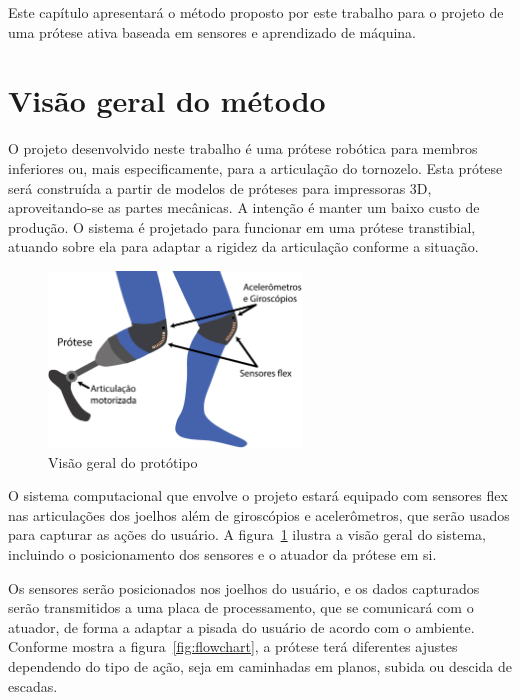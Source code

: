 Este capítulo apresentará o método proposto por este trabalho para o projeto de uma prótese ativa baseada em sensores e aprendizado de máquina.

\section{Visão geral do método}
\label{sec:metodo_protese}

O projeto desenvolvido neste trabalho é uma prótese robótica para membros inferiores ou, mais especificamente, para a articulação do tornozelo. Esta prótese será construída a partir de modelos de próteses para impressoras 3D, aproveitando-se as partes mecânicas. A intenção é manter um baixo custo de produção. O sistema é projetado para funcionar em uma prótese transtibial, atuando sobre ela para adaptar a rigidez da articulação conforme a situação.

\begin{figure}[h]
	\caption{\label{fig:big_picture}Visão geral do protótipo}
	\begin{center}
	    \includegraphics[width=0.6\textwidth]{resources/big_picture}
	\end{center}
\end{figure}

O sistema computacional que envolve o projeto estará equipado com sensores flex nas articulações dos joelhos além de giroscópios e acelerômetros, que serão usados para capturar as ações do usuário. A figura~\ref{fig:big_picture} ilustra a visão geral do sistema, incluindo o posicionamento dos sensores e o atuador da prótese em si.

Os sensores serão posicionados nos joelhos do usuário, e os dados capturados serão transmitidos a uma placa de processamento, que se comunicará com o atuador, de forma a adaptar a pisada do usuário de acordo com o ambiente. Conforme mostra a figura~\ref{fig:flowchart}, a prótese terá diferentes ajustes dependendo do tipo de ação, seja em caminhadas em planos, subida ou descida de escadas.

